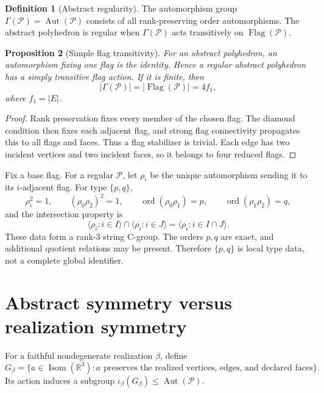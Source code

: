 \documentclass[11pt,a4paper]{article}
\theoremstyle{definition}
\newtheorem{definition}{Definition}[section]
\theoremstyle{plain}
\newtheorem{proposition}[definition]{Proposition}
\theoremstyle{remark}
\newcommand{\R}{\mathbb{R}}
\newcommand{\Aut}{\operatorname{Aut}}
\newcommand{\Isom}{\operatorname{Isom}}
\newcommand{\Flag}{\operatorname{Flag}}
\newcommand{\ord}{\operatorname{ord}}
\newcommand{\abs}[1]{\left\lvert #1\right\rvert}
\newcommand{\Pcal}{\mathcal P}
\begin{document}
\begin{definition}[Abstract regularity]
The automorphism group \(\Gamma(\Pcal)=\Aut(\Pcal)\) consists of all
rank-preserving order automorphisms.  The abstract polyhedron is
regular when \(\Gamma(\Pcal)\) acts transitively on
\(\Flag(\Pcal)\).
\end{definition}

\begin{proposition}[Simple flag transitivity]
\label{prop:simple}
For an abstract polyhedron, an automorphism fixing one flag is the
identity.  Hence a regular abstract polyhedron has a simply transitive
flag action.  If it is finite, then
\begin{equation}\label{eq:flags-group}
\abs{\Gamma(\Pcal)}=\abs{\Flag(\Pcal)}=4f_1,
\end{equation}
where \(f_1=\abs E\).
\end{proposition}

\begin{proof}
Rank preservation fixes every member of the chosen flag.  The diamond
condition then fixes each adjacent flag, and strong flag connectivity
propagates this to all flags and faces.  Thus a flag stabilizer is
trivial.  Each edge has two incident vertices and two incident faces,
so it belongs to four reduced flags.
\end{proof}

Fix a base flag.  For a regular \(\Pcal\), let \(\rho_i\) be the
unique automorphism sending it to its \(i\)-adjacent flag.  For type
\(\{p,q\}\),
\begin{equation}\label{eq:cgroup}
\rho_i^2=1,\qquad
(\rho_0\rho_2)^2=1,\qquad
\ord(\rho_0\rho_1)=p,\qquad
\ord(\rho_1\rho_2)=q,
\end{equation}
and the intersection property is
\begin{equation}\label{eq:intersection}
\langle\rho_i:i\in I\rangle\cap
\langle\rho_i:i\in J\rangle
=\langle\rho_i:i\in I\cap J\rangle .
\end{equation}
These data form a rank-\(3\) string C-group.  The orders \(p,q\) are
exact, and additional quotient relations may be present.  Therefore
\(\{p,q\}\) is local type data, not a complete global identifier.

\section{Abstract symmetry versus realization symmetry}

For a faithful nondegenerate realization \(\beta\), define
\[
G_\beta=
\{a\in\Isom(\R^3):a\text{ preserves the realized vertices, edges,
and declared faces}\}.
\]
Its action induces a subgroup
\(\iota_\beta(G_\beta)\leq\Aut(\Pcal)\).
\end{document}
